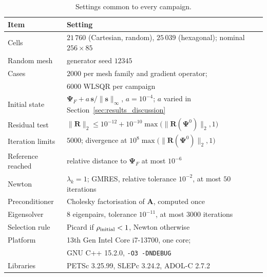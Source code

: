 \begin{table}[h]
\centering
\caption{Settings common to every campaign.}
\label{tab:protocol}
\small
\begin{tabular}{ll}
\toprule
Item & Setting \\
\midrule
Cells & $21\,760$ (Cartesian, random), $25\,039$ (hexagonal); nominal $256\times85$ \\
Random mesh & generator seed $12345$ \\
Cases & $2000$ per mesh family and gradient operator; \\ &$6000$ WLSQR per campaign \\
Initial state & $\bm{\Psi}_F+a\,\mathbf{s}/\|\mathbf{s}\|_{\infty}$, $a=10^{-4}$; $a$ varied in Section~\ref{sec:results_discussion} \\
Residual test & $\|\mathbf{R}\|_2\leq10^{-12}+10^{-10}\max\bigl(\|\mathbf{R}(\bm{\Psi}^{0})\|_2,1\bigr)$ \\
Iteration limits & $5000$; divergence at $10^{8}\max\bigl(\|\mathbf{R}(\bm{\Psi}^{0})\|_2,1\bigr)$ \\
Reference reached & relative distance to $\bm{\Psi}_F$ at most $10^{-6}$ \\
Newton & $\lambda_k=1$; GMRES, relative tolerance $10^{-2}$, at most $50$ iterations \\
Preconditioner & Cholesky factorisation of $\mathbf{A}$, computed once \\
Eigensolver & $8$ eigenpairs, tolerance $10^{-11}$, at most $3000$ iterations \\
Selection rule & Picard if $\rho_{\rm initial}<1$, Newton otherwise \\
Platform & 13th Gen Intel Core i7-13700, one core; \\
& GNU C++ 15.2.0, \texttt{-O3 -DNDEBUG} \\
Libraries & PETSc 3.25.99, SLEPc 3.24.2, ADOL-C 2.7.2 \\
\bottomrule
\end{tabular}
\end{table}
